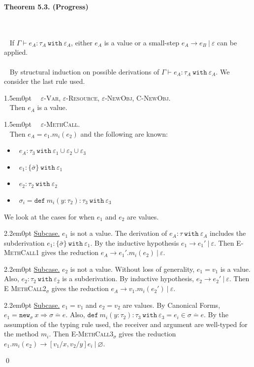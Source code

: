 \documentclass{llncs}
\newcommand{\keywadj}[1]{\mathtt{#1}}
\newcommand{\keyw}[1]{\keywadj{#1}~}
\newcommand{\thm}[3]{
	\begin{large}
		\bf{#1}
	\end{large} \\\\
	\fbox{Statement.} ~ #2
	\fbox{Proof.}~ #3 \qed
}
\newcommand{\proofcase}[2]{
	\begin{adjustwidth}{1.5em}{0pt}
		\fbox{Case.}~~#1. \\ ~#2
	\end{adjustwidth}
}
\newcommand{\subcase}[1] {
	\begin{adjustwidth}{2.2em}{0pt}
		\underline{Subcase.} #1
	\end{adjustwidth}
}
\begin{document}
\thm{Theorem 5.3. (Progress)}
{If $\Gamma \vdash e_A : \tau_A~\keyw{with} \varepsilon_A$, either $e_A$ is a value or a small-step $e_A \longrightarrow e_B~|~\varepsilon$ can be applied. \\\\}
{By structural induction on possible derivations of $\Gamma \vdash e_A : \tau_A~\keyw{with} \varepsilon_A$. We consider the last rule used. \\

	\proofcase{\textsc{$\varepsilon$-Var}, \textsc{$\varepsilon$-Resource}, \textsc{$\varepsilon$-NewObj}, \textsc{C-NewObj}} {
		Then $e_A$ is a value. \\
	}
		
	\proofcase{\textsc{$\varepsilon$-MethCall}} {
		Then $e_A = e_1.m_i(e_2)$ and the following are known:
		\begin{itemize}
			\item~$e_A : \tau_3~\keyw{with} \varepsilon_1 \cup \varepsilon_2 \cup \varepsilon_3$
			\item~$e_1  : \{ \overline \sigma \}~ \keyw{with} \varepsilon_1$
			\item~$e_2 : \tau_2~\keyw{with} \varepsilon_2$
			\item~$\sigma_i = \keyw{def} m_i(y : \tau_2) : \tau_3~ \keyw{with} \varepsilon_3$
		\end{itemize}
		We look at the cases for when $e_1$ and $e_2$ are values.
		
			\subcase{ $e_1$ is not a value. The derivation of $e_A : \tau~\keyw{with} \varepsilon_A$ includes the subderivation $e_1 : \{ \bar \sigma \}~\keyw{with} \varepsilon_1$. By the inductive hypothesis $e_1 \longrightarrow e_1'~|~\varepsilon$. Then \textsc{E-MethCall1} gives the reduction $e_A \longrightarrow e_1'.m_i(e_2)~|~\varepsilon$. }
	
			\subcase{ $e_2$ is not a value. Without loss of generality, $e_1 = v_1$ is a value. Also,
		$e_2 : \tau_2~\keyw{with} \varepsilon_2$ is a subderivation. By inductive hypothesis, $e_2 \longrightarrow e_2'~|~\varepsilon$. Then \textsc{E
		MethCall2$_{\sigma}$} gives the reduction $e_A \longrightarrow
		v_1.m_i(e_2')~|~\varepsilon$.}
		
			\subcase{ $e_1 = v_1$ and $e_2 = v_2$ are values. By Canonical Forms, $e_1 = \keywadj{new}_{\sigma}~x \Rightarrow \overline{\sigma = e}$. Also, $\keyw{def} m_i(y: \tau_2) : \tau_3~\keyw{with} \varepsilon_3 = e_i \in \overline{ \sigma = e }$. By the assumption of the typing rule used, the receiver and argument are well-typed for the method $m_i$. Then \textsc{E-MethCall3$_{\sigma}$} gives the reduction $e_1.m_i(e_2) \longrightarrow [v_1/x, v_2/y]e_i~|~\varnothing$.\\}

}}
\end{document}
